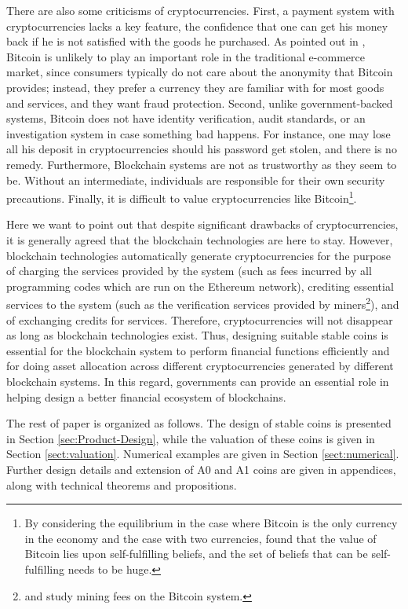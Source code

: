 \documentclass[draft, noinfoline]{ectaart}
\numberwithin{equation}{section}
\theoremstyle{plain}
\begin{document}
There are also some criticisms of cryptocurrencies. First, a payment system with cryptocurrencies lacks a key feature, the confidence that one can get his money back if he is not satisfied with the goods he purchased. As pointed out in \cite{grinberg_bitcoin:_2011}, Bitcoin is unlikely to play an important role in the traditional e-commerce market, since consumers typically do not care about the anonymity that Bitcoin provides; instead, they prefer a currency they are familiar with for most goods and services, and they want fraud protection.  Second, unlike government-backed systems, Bitcoin does not have identity verification, audit standards, or an investigation system in case something bad happens. For instance, one may lose all his deposit in cryptocurrencies should his password get stolen, and there is no remedy. Furthermore, Blockchain systems are not as trustworthy as they seem to be. Without an intermediate, individuals are responsible for their own security precautions. Finally, it is difficult to value cryptocurrencies like Bitcoin\footnote{By considering the equilibrium in the case where Bitcoin is the only currency in the economy and the case with two currencies, \cite{garratt_bitcoin_2018} found that the value of Bitcoin lies upon self-fulfilling beliefs, and the set of beliefs that can be self-fulfilling needs to be huge.}.

Here we want to point out that despite significant drawbacks of cryptocurrencies, it is generally agreed that the blockchain technologies are here to stay. However, blockchain technologies automatically generate cryptocurrencies for the purpose of charging the services provided by the system (such as fees incurred by all programming codes which are run on the Ethereum network), crediting essential services to the system (such as the verification services provided by miners\footnote{\cite{ehb2017} and \cite{hlm2017} study mining fees on the Bitcoin system.}), and of exchanging credits for services. Therefore, cryptocurrencies will not disappear as long as blockchain technologies exist. Thus, designing suitable stable coins is essential for the blockchain system to perform financial functions efficiently and for doing asset allocation across different cryptocurrencies generated by different blockchain systems. In this regard, governments can provide an essential role in helping design a better financial ecosystem of blockchains.

The rest of paper is organized as follows. The design of stable coins is presented in Section \ref{sec:Product-Design}, while the valuation of these coins is given in Section \ref{sect:valuation}. Numerical examples are given in Section \ref{sect:numerical}. Further design details and extension of A0 and A1 coins are given in appendices, along with technical theorems and propositions.
\end{document}
